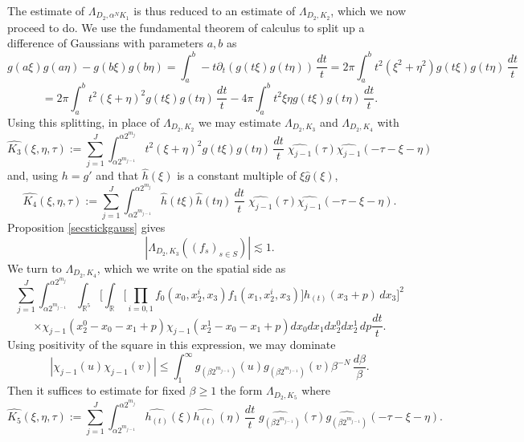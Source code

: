 \documentclass[12pt,reqno]{amsart}
\theoremstyle{plain}
\theoremstyle{definition}
\numberwithin{equation}{section}
\newcommand{\R}{{\mathbb R}}
\begin{document}
  
The estimate of $\Lambda_{D_2,\alpha^{N}K_1} $ is thus reduced to an estimate of 
$\Lambda_{D_2,K_2}$, which we now proceed to do.
We use the fundamental theorem of calculus to split up a difference of Gaussians with parameters $a,b$ as
\[ {g}(a\xi){g}(a\eta) - {g}(b\xi){g}(b\eta) = 
\int_{a}^{b}   -t\partial_t ( g(t\xi) g(t\eta)) \, \frac{dt}{t}
 = 2\pi \int_{a}^{b} t^2(\xi^2+\eta^2) g(t\xi) g(t\eta)\, \frac{dt}{t}\]
\begin{equation}\label{polid} = 2\pi \int_{a}^{b} t^2(\xi+\eta)^2 g(t\xi) g(t\eta) \,\frac{dt}{t} - 4\pi  \int_{a}^{b} t^2\xi\eta g(t\xi)  g(t\eta)\,
\frac{dt}{t}  .\end{equation}
Using this splitting, in place of $\Lambda_{D_2,K_2}$ we may estimate 
$\Lambda_{D_2,K_3}$ and $\Lambda_{D_2,K_4}$
with
\begin{equation*}
\widehat{K_3}(\xi,\eta,\tau):= \sum_{j=1}^J \int_{\alpha 2^{m_{j-1}}}^{{\alpha 2^{m_{j}}}} t^2(\xi+\eta)^2 g(t\xi) g(t\eta) \, \frac{dt}{t} \;\widehat{\chi_{j-1}}(\tau)\widehat{\chi_{j-1}}(-\tau-\xi-\eta) 
\end{equation*}
and, using $h=g'$ and that $\widehat{h}(\xi)$ is a constant multiple of $\xi\widehat{g}(\xi)$,
\begin{equation*}
\widehat{K_4}(\xi,\eta,\tau):=  \sum_{j=1}^J \int_{\alpha 2^{m_{j-1}}}^{{\alpha 2^{m_{j}}}}
\widehat{h} (t\xi)  \widehat{h}(t\eta)\,
\frac{dt}{t}\;\widehat{\chi_{j-1}}(\tau)\widehat{\chi_{j-1}}(-\tau-\xi-\eta).
\end{equation*}
Proposition \ref{secstickgauss} gives
\[|\Lambda_{D_2,K_3}((f_s)_{s\in S})| \lesssim 1 .\]
 We turn to $\Lambda_{D_2,K_4}$, which we write on the spatial side as
\[
 \sum_{j=1}^J \int_{\alpha 2^{m_{j-1}}}^{{\alpha 2^{m_{j}}}} \int_{\R^5}  \Big[ \int_{\R} 
 \Big[ \prod_{i=0,1}  f_0(x_0, x_2^i,x_3) f_1(x_1,x_2^i,x_3)  \Big ]
 h_{(t)} (x_3+p)\, dx_3 \Big ]^2       \]
 \begin{equation*}
   \times  \chi_{j-1}(x_2^0-x_0-x_1+p)   \chi_{j-1}(x_2^1-x_0-x_1+p) dx_0 dx_1 dx_2^0 dx_2^1 \,   dp \frac{dt}{t}.
 \end{equation*}
Using positivity of the square in this expression, we may dominate
$$|\chi_{j-1}(u)\chi_{j-1}(v)|\le 
\int_{1}^\infty  
g_{(\beta2^{m_{j-1}})}(u)g_{(\beta2^{m_{j-1}})}(v) \beta^{-N}\, \frac {d\beta}\beta.$$
Then   it suffices to estimate for fixed $\beta\ge 1$ the form $\Lambda_{D_2,K_5}$
where 
\begin{equation*}
\widehat{K_5}(\xi,\eta,\tau)  :=   \sum_{j=1}^J \int_{\alpha 2^{m_{j-1}}}^{{\alpha 2^{m_{j}}}} \widehat{h_{(t)}}(\xi)\widehat{h_{(t)}}(\eta) \, \frac{dt}{t}\;\widehat{g_{(\beta 2^{m_{j-1}})}}(\tau)\widehat{g_{(\beta 2^{m_{j-1}})}}(-\tau-\xi-\eta)  .
\end{equation*}
\end{document}
